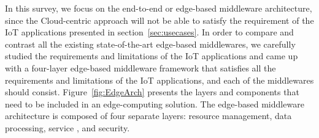 In this survey, we focus on the end-to-end or edge-based middleware architecture, since the Cloud-centric approach will not be able to satisfy the requirement of the IoT applications presented in section~\ref{sec:usecases}. In order to compare and contrast all the existing state-of-the-art edge-based middlewares, we carefully studied the requirements and limitations of the IoT applications and came up with a four-layer edge-based middleware framework that satisfies all the requirements and limitations of the IoT applications, and each of the middlewares should consist. Figure~\ref{fig:EdgeArch} presents the layers and components that need to be included in an edge-computing solution. The edge-based middleware architecture is composed of four separate layers: resource management, data processing, service , and security.

